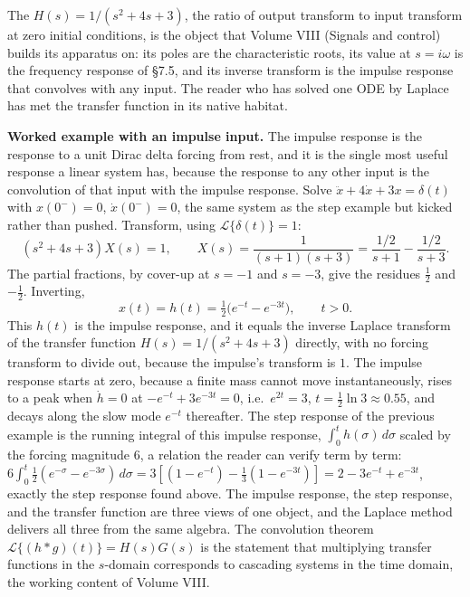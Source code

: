 The  $H(s) = 1/(s^{2} + 4s + 3)$, the
ratio of output transform to input transform at zero initial
conditions, is the object that Volume VIII (Signals and control)
builds its apparatus on: its poles are the characteristic roots, its
value at $s = i\omega$ is the frequency response of \S7.5, and its
inverse transform is the impulse response that convolves with any
input. The reader who has solved one ODE by Laplace has met the
transfer function in its native habitat.

\textbf{Worked example with an impulse input.} The impulse response
is the response to a unit Dirac delta forcing from rest, and it is
the single most useful response a linear system has, because the
response to any other input is the convolution of that input with
the impulse response. Solve $\ddot{x} + 4\dot{x} + 3x = \delta(t)$
with $x(0^{-}) = 0$, $\dot{x}(0^{-}) = 0$, the same system as the
step example but kicked rather than pushed. Transform, using
$\mathcal{L}\{\delta(t)\} = 1$:
\[
(s^{2} + 4s + 3) X(s) = 1, \qquad X(s) = \frac{1}{(s+1)(s+3)} =
\frac{1/2}{s+1} - \frac{1/2}{s+3}.
\]
The partial fractions, by cover-up at $s = -1$ and $s = -3$, give
the residues $\tfrac{1}{2}$ and $-\tfrac{1}{2}$. Inverting,
\[
x(t) = h(t) = \tfrac{1}{2}\bigl(e^{-t} - e^{-3t}\bigr), \qquad t > 0.
\]
This $h(t)$ is the impulse response, and it equals the inverse
Laplace transform of the transfer function $H(s) = 1/(s^{2} + 4s +
3)$ directly, with no forcing transform to divide out, because the
impulse's transform is $1$. The impulse response starts at zero,
because a finite mass cannot move instantaneously, rises to a peak
when $\dot{h} = 0$ at $-e^{-t} + 3e^{-3t} = 0$, i.e.\ $e^{2t} = 3$,
$t = \tfrac{1}{2}\ln 3 \approx 0.55$, and decays along the slow mode
$e^{-t}$ thereafter. The step response of the previous example is the
running integral of this impulse response, $\int_{0}^{t} h(\sigma)\,
d\sigma$ scaled by the forcing magnitude $6$, a relation the reader
can verify term by term: $6\int_{0}^{t} \tfrac{1}{2}(e^{-\sigma} -
e^{-3\sigma})\,d\sigma = 3[(1 - e^{-t}) - \tfrac{1}{3}(1 - e^{-3t})]
= 2 - 3e^{-t} + e^{-3t}$, exactly the step response found above. The
impulse response, the step response, and the transfer function are
three views of one object, and the Laplace method delivers all
three from the same algebra. The convolution theorem
$\mathcal{L}\{(h \ast g)(t)\} = H(s)G(s)$ is the statement that
multiplying transfer functions in the $s$-domain corresponds to
cascading systems in the time domain, the working content of
Volume VIII.

